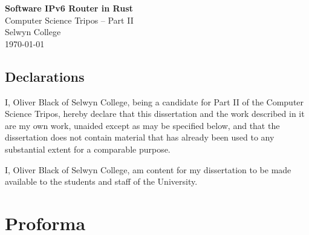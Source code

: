 \documentclass[12pt,a4paper,twoside,openright]{report}
\begin{document}





\pagestyle{empty}



\vspace*{60mm}
\begin{center}
\Huge
\textbf{Software IPv6 Router in Rust} \\[5mm]
Computer Science Tripos -- Part II \\[5mm]
Selwyn College \\[5mm]
\today  %
\end{center}

\newpage
{}
\section*{Declarations}

I, Oliver Black of Selwyn College, being a candidate for Part II of the Computer Science Tripos, hereby declare that this dissertation and the work described in it are my own work, unaided except as may be specified below, and that the dissertation does not contain material that has already been used to any substantial extent for a comparable purpose.

\bigskip
{}

\medskip
{}

\bigskip
\bigskip

\vfill
\noindent
I, Oliver Black of Selwyn College, am content for my dissertation to be made available to the students and staff of the University.

\bigskip
{}

\medskip
{}
\vspace{0.4\textheight}


\pagestyle{plain}

\chapter*{Proforma}
\end{document}
